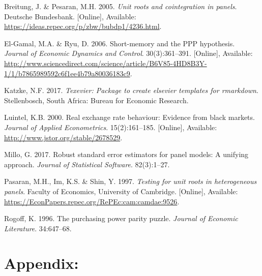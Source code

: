 \documentclass[11pt,preprint, authoryear]{elsarticle}
\numberwithin{equation}{section}
\numberwithin{figure}{section}
\numberwithin{table}{section}
\newlength{\cslhangindent}
\newenvironment{CSLReferences}%
  {\setlength{\parindent}{0pt}%
  \everypar{\setlength{\hangindent}{\cslhangindent}}\ignorespaces}%
  {\par}
\begin{document}
\hypertarget{refs}{}
\begin{CSLReferences}{1}{0}
\leavevmode\hypertarget{ref-pes}{}%
Breitung, J. \& Pesaran, M.H. 2005. \emph{Unit roots and cointegration
in panels}. Deutsche Bundesbank. {[}Online{]}, Available:
\url{https://ideas.repec.org/p/zbw/bubdp1/4236.html}.

\leavevmode\hypertarget{ref-puz}{}%
El-Gamal, M.A. \& Ryu, D. 2006. Short-memory and the PPP hypothesis.
\emph{Journal of Economic Dynamics and Control}. 30(3):361--391.
{[}Online{]}, Available:
\url{http://www.sciencedirect.com/science/article/B6V85-4HD8B3Y-1/1/b7865989592c6f1ee4b79a80036183c9}.

\leavevmode\hypertarget{ref-Texevier}{}%
Katzke, N.F. 2017. \emph{{Texevier}: {P}ackage to create elsevier
templates for rmarkdown}. Stellenbosch, South Africa: Bureau for
Economic Research.

\leavevmode\hypertarget{ref-Kul}{}%
Luintel, K.B. 2000. Real exchange rate behaviour: Evidence from black
markets. \emph{Journal of Applied Econometrics}. 15(2):161--185.
{[}Online{]}, Available: \url{http://www.jstor.org/stable/2678529}.

\leavevmode\hypertarget{ref-plm}{}%
Millo, G. 2017. Robust standard error estimators for panel models: A
unifying approach. \emph{Journal of Statistical Software}. 82(3):1--27.

\leavevmode\hypertarget{ref-im}{}%
Pasaran, M.H., Im, K.S. \& Shin, Y. 1997. \emph{Testing for unit roots
in heterogeneous panels}. Faculty of Economics, University of Cambridge.
{[}Online{]}, Available:
\url{https://EconPapers.repec.org/RePEc:cam:camdae:9526}.

\leavevmode\hypertarget{ref-rog}{}%
Rogoff, K. 1996. The purchasing power parity puzzle. \emph{Journal of
Economic Literature}. 34:647--68.

\end{CSLReferences}

\newpage

\hypertarget{appendix}{%
\section*{\texorpdfstring{Appendix:
\label{A}}{Appendix: }}\label{appendix}}
\end{document}

